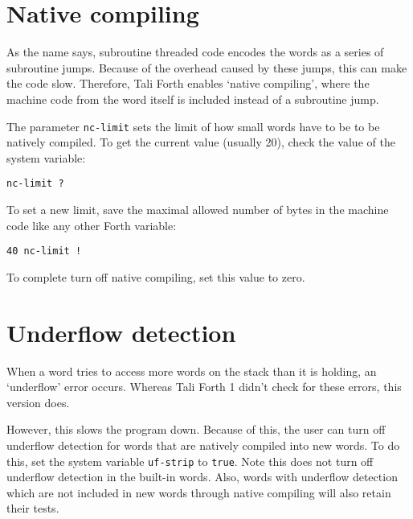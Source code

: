 \section{Native compiling}

As the name says, subroutine threaded code encodes the words as
a series of subroutine jumps. Because of the overhead caused by these jumps,
this can make the code slow. Therefore, Tali Forth enables `native compiling',
where the machine code from the word itself is included instead of a subroutine
jump. 

The parameter \texttt{nc-limit} sets the limit
of how small words have to be to be natively compiled. To get the current value
(usually 20), check the value of the system variable: 

\begin{lstlisting}[frame=lines]
        nc-limit ?
\end{lstlisting}

\noindent To set a new limit, save the maximal allowed number of bytes in the
machine code like any other Forth variable:

\begin{lstlisting}[frame=lines]
        40 nc-limit !
\end{lstlisting}

To complete turn off native compiling, set this value to zero.


\section{Underflow detection}

When a word tries to access more words on the stack than it is holding, an
`underflow' error occurs. Whereas Tali Forth 1 didn't check
for these errors, this version does. 

However, this slows the program down. Because of this, the user can turn off
underflow detection for words that are natively compiled into new words. To do
this, set the system variable
\texttt{uf-strip} to
\texttt{true}. Note this does not turn off underflow
detection in the built-in words. Also, words with underflow detection which are
not included in new words through native compiling will also retain their tests.


